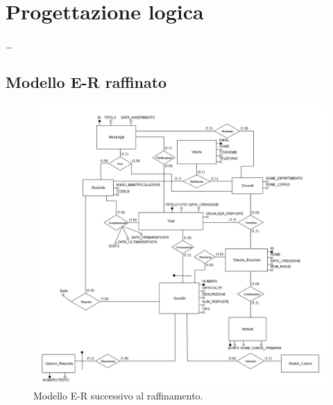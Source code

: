 \documentclass{article}
\begin{document}
\newpage
\section{Progettazione logica}
\large
\dots

\subsection{Modello E-R raffinato}
\large
\begin{figure}[H]
    \includegraphics*[width=1.1\textwidth]{foto2.png}
    \caption{Modello E-R successivo al raffinamento.}
\end{figure}
\end{document}
